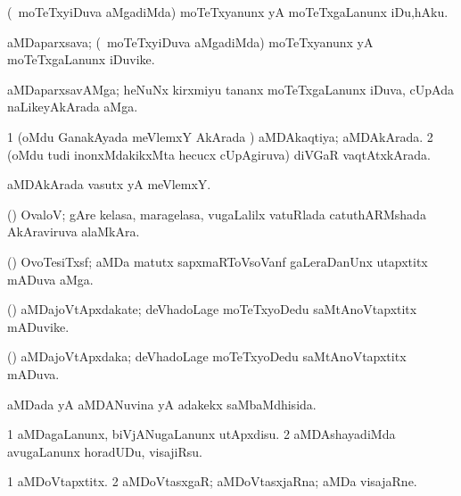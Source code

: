 \bentry
{}
\gl{\akirx}
\bmng
(\kanmu\ moTeTxyiDuva aMgadiMda) moTeTxyanunx yA moTeTxgaLanunx iDu,hAku. 
\emng
\eentry

\bentry
{}
\gl{\nA}
\bmng
aMDaparxsava; (\kanmu\ moTeTxyiDuva aMgadiMda) moTeTxyanunx yA moTeTxgaLanunx iDuvike. 
\emng
\eentry

\bentry
{}
\gl{\nA}
\bmng
aMDaparxsavAMga; heNuNx kirxmiyu tananx moTeTxgaLanunx iDuva, cUpAda naLikeyAkArada aMga. 
\emng
\eentry

\bentry
{}
\gl{\gu}
\bmng
\bnum
\num{1} (oMdu GanakAyada meVlemxY AkArada \vi) aMDAkaqtiya; aMDAkArada. 
\num{2} (oMdu tudi inonxMdakikxMta hecucx cUpAgiruva) diVGaR vaqtAtxkArada. 
\enum
\emng
\eentry

\bentry
{}
\gl{\nA}
\bmng
aMDAkArada vasutx yA meVlemxY. 
\emng
\eentry

\bentry
{}
\gl{\nA}
\bmng
(\vAshi) OvaloV; gAre kelasa, maragelasa, \mo vugaLalilx vatuRlada catuthARMshada AkAraviruva alaMkAra. 
\emng
\eentry

\bentry
{}
\gl{\nA}
\bmng
(\pArxvi) OvoTesiTxsf; aMDa matutx sapxmaRToVsoVanf gaLeraDanUnx utapxtitx mADuva aMga. 
\emng
\eentry

\bentry
{}
\gl{\nA}
\bmng
(\pArxvi) aMDajoVtApxdakate; deVhadoLage moTeTxyoDedu saMtAnoVtapxtitx mADuvike. 
\emng
\eentry

\bentry
{}
\gl{\gu}
\bmng
(\pArxvi) aMDajoVtApxdaka; deVhadoLage moTeTxyoDedu saMtAnoVtapxtitx mADuva. 
\emng
\eentry

\bentry
{}
\gl{\gu}
\bmng
aMDada yA aMDANuvina yA adakekx saMbaMdhisida. 
\emng
\eentry

\bentry
{}
\gl{\akirx}
\bmng
\bnum
\num{1} aMDagaLanunx, biVjANugaLanunx utApxdisu. 
\num{2} aMDAshayadiMda avugaLanunx horadUDu, visajiRsu. 
\enum
\emng
\eentry

\bentry
{}
\gl{\nA}
\bmng
\bnum
\num{1} aMDoVtapxtitx. 
\num{2} aMDoVtasxgaR; aMDoVtasxjaRna; aMDa visajaRne. 
\enum
\emng
\eentry

